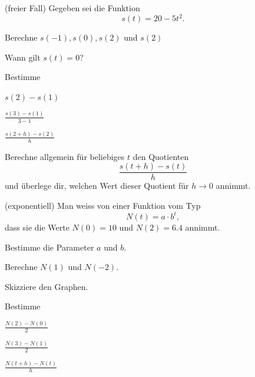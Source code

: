 \documentclass[%
11pt,%
twoside,%
titlepage,%
german,%
headsepline%
]{scrartcl}
\begin{document}
\begin{ueb}(freier Fall)
Gegeben sei die Funktion
$$s(t)=20-5t^2.$$
\begin{enumeratea}
\item Berechne $s(-1),s(0),s(2)$ und $s(2)$
\item Wann gilt $s(t)=0$?
\item Bestimme
\begin{enumeratei}
\item $s(2)-s(1)$
\item $\frac{s(3)-s(1)}{3-1}$
\item $\frac{s(2+h)-s(2)}{h}$
\end{enumeratei}
\item Berechne allgemein für beliebiges $t$ den Quotienten
$$\frac{s(t+h)-s(t)}{h}$$
und überlege dir, welchen Wert dieser Quotient für $h\to0$ annimmt.
\end{enumeratea}
\end{ueb}

\begin{ueb}(exponentiell)
Man weiss von einer Funktion vom Typ
$$N(t)=a\cdot b^t,$$
dass sie die Werte $N(0)=10$ und $N(2)=6.4$ annimmt.
\begin{enumeratea}
\item Bestimme die Parameter $a$ und $b$.
\item Berechne $N(1)$ und $N(-2)$.
\item Skizziere den Graphen.
\item Bestimme
\begin{enumeratei}
\item $\frac{N(2)-N(0)}{2}$
\item $\frac{N(3)-N(1)}{2}$
\item $\frac{N(t+h)-N(t)}{h}$
\end{enumeratei}
\end{enumeratea}
\end{ueb}

\pagebreak




\pagebreak
\end{document}
